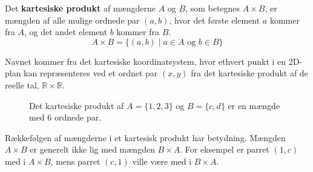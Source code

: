 \begin{definition}
    Det \textbf{kartesiske produkt} af mængderne $A$ og $B$, som betegnes $A \times B$, er mængden af alle mulige ordnede par $(a, b)$, hvor det første element $a$ kommer fra $A$, og det andet element $b$ kommer fra $B$.
    \[ A \times B = \{ (a, b) \mid a \in A \text{ og } b \in B \} \]
\end{definition}

Navnet kommer fra det kartesiske koordinatsystem, hvor ethvert punkt i en 2D-plan kan repræsenteres ved et ordnet par $(x, y)$ fra det kartesiske produkt af de reelle tal, $\mathbb{R} \times \mathbb{R}$.

\begin{figure}[htbp]
    \centering
    \caption{Det kartesiske produkt af $A=\{1,2,3\}$ og $B=\{c,d\}$ er en mængde med 6 ordnede par.}
    \label{fig:cartesian_product}
\end{figure}

\begin{remark}
    Rækkefølgen af mængderne i et kartesisk produkt har betydning. Mængden $A \times B$ er generelt ikke lig med mængden $B \times A$. For eksempel er parret $(1, c)$ med i $A \times B$, mens parret $(c, 1)$ ville være med i $B \times A$.
\end{remark}

